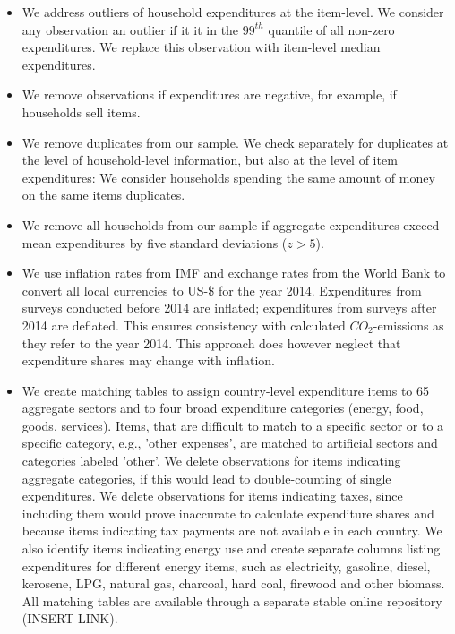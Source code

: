 \documentclass[12pt, a4paper]{article}
\begin{document}
\begin{itemize}
    \item We address outliers of household expenditures at the item-level. We consider any observation an outlier if it it in the $99^{th}$ quantile of all non-zero expenditures. We replace this observation with item-level median expenditures.
    \item We remove observations if expenditures are negative, for example, if households sell items.
    \item We remove duplicates from our sample. We check separately for duplicates at the level of household-level information, but also at the level of item expenditures: We consider households spending the same amount of money on the same items duplicates.
    \item We remove all households from our sample if aggregate expenditures exceed mean expenditures by five standard deviations ($z>5$).
    \item We use inflation rates from IMF and exchange rates from the World Bank to convert all local currencies to US-\$ for the year 2014. Expenditures from surveys conducted before 2014 are inflated; expenditures from surveys after 2014 are deflated. This ensures consistency with calculated $CO_{2}$-emissions as they refer to the year 2014. This approach does however neglect that expenditure shares may change with inflation.
    \item We create matching tables to assign country-level expenditure items to 65 aggregate sectors and to four broad expenditure categories (energy, food, goods, services). Items, that are difficult to match to a specific sector or to a specific category, e.g., 'other expenses', are matched to artificial sectors and categories labeled 'other'. We delete observations for items indicating aggregate categories, if this would lead to double-counting of single expenditures. We delete observations for items indicating taxes, since including them would prove inaccurate to calculate expenditure shares and because items indicating tax payments are not available in each country. We also identify items indicating energy use and create separate columns listing expenditures for different energy items, such as electricity, gasoline, diesel, kerosene, LPG, natural gas, charcoal, hard coal, firewood and other biomass. All matching tables are available through a separate stable online repository (INSERT LINK).
\end{itemize}

\end{document}
